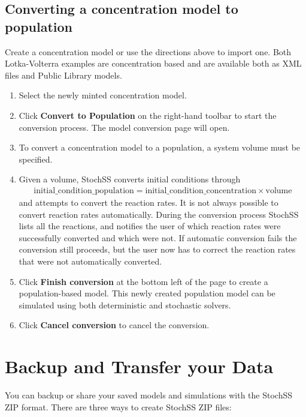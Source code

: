 \subsection{Converting a concentration model to population}
Create a concentration model or use the directions above to import one. Both Lotka-Volterra examples are concentration based and are available both as XML files and Public Library models.

\begin{enumerate}
  \item Select the newly minted concentration model.
  \item Click \textbf{Convert to Population} on the right-hand toolbar to start the conversion process. The model conversion page will open.
  \item To convert a concentration model to a population, a system volume must be specified.
  \item Given a volume, StochSS converts initial conditions through 
  \begin{align}
  \mathrm{initial\_condition\_population} = \mathrm{initial\_condition\_concentration}\times\mathrm{volume}
  \end{align}
   and attempts to convert the reaction rates. It is not always possible to convert reaction rates automatically. During the conversion process StochSS lists all the reactions, and notifies the user of which reaction rates were successfully converted and which were not. If automatic conversion fails the conversion still proceeds, but the user now has to correct the reaction rates that were not automatically converted.
  \item Click \textbf{Finish conversion} at the bottom left of the page to create a population-based model. This newly created population model can be simulated using both deterministic and stochastic solvers.
  \item Click \textbf{Cancel conversion} to cancel the conversion.
\end{enumerate}


\section{Backup and Transfer your Data}
You can backup or share your saved models and simulations with the StochSS ZIP format. There are three ways to create StochSS ZIP files:

